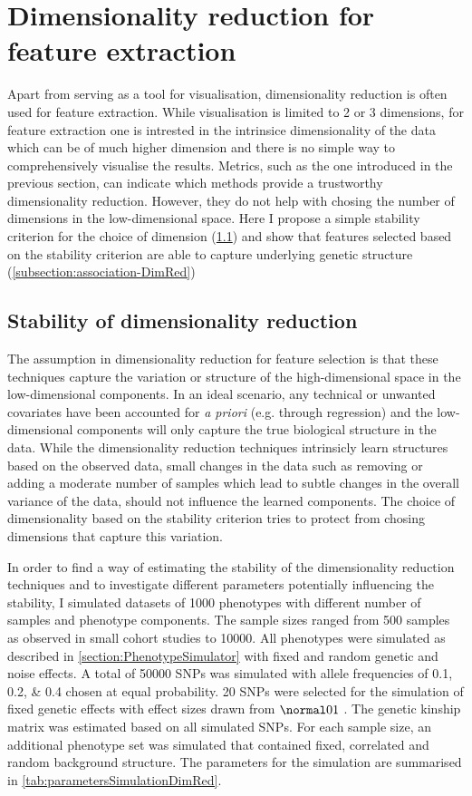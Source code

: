 \section{Dimensionality reduction for feature extraction}
Apart from serving as a tool for visualisation, dimensionality reduction is often used for feature extraction. While visualisation is limited to \num{2} or \num{3} dimensions, for feature extraction one is intrested in the intrinsice dimensionality of the data which can be of much higher dimension and there is no simple way to comprehensively visualise the results. Metrics, such as the one introduced in the previous section, can indicate which methods provide a trustworthy dimensionality reduction. However, they do not help with chosing the number of dimensions in the low-dimensional space. Here I propose a simple stability criterion for the choice of dimension (\cref{subsection:stability-DimRed}) and show that features selected based on the stability criterion are able to capture underlying genetic structure (\cref{subsection:association-DimRed})

\subsection{Stability of dimensionality reduction}
\label{subsection:stability-DimRed}
The assumption in dimensionality reduction for feature selection is that these techniques capture the variation or structure of the high-dimensional space in the low-dimensional components. In an ideal scenario, any technical or unwanted covariates have been accounted for \textit{a priori} (e.g. through regression) and the low-dimensional components will only capture the true biological structure in the data. While the dimensionality reduction techniques intrinsicly learn structures based on the observed data, small changes in the data such as removing or adding a moderate number of samples which lead to subtle changes in the overall variance of the data, should not influence the learned components. The choice of dimensionality based on the stability criterion tries to protect from chosing dimensions that capture this variation. 

In order to find a way of estimating the stability of the dimensionality reduction techniques and to investigate different parameters potentially influencing the stability, I simulated datasets of \num{1000} phenotypes with different number of samples and phenotype components. The sample sizes ranged from \num{500} samples as observed in small cohort studies \red{\citep{}} to \num{10000}. All phenotypes were simulated as described in \cref{section:PhenotypeSimulator} with fixed and random genetic and noise effects. A total of \num{50000} SNPs was simulated with allele frequencies of \numlist{0.1;0.2;0.4} chosen at equal probability. \num{20} SNPs were selected for the simulation of fixed genetic effects with effect sizes drawn from \(\normal 0 1\) . The genetic kinship matrix was estimated based on all simulated SNPs. For each sample size, an additional phenotype set was simulated that contained fixed, correlated and random background structure. The parameters for the simulation are summarised in \cref{tab:parametersSimulationDimRed}. 

